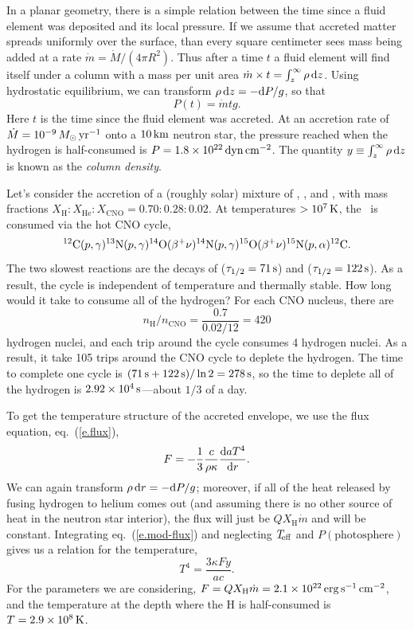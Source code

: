 In a planar geometry, there is a simple relation between the time since a fluid element was deposited and its local pressure. If we assume that accreted matter spreads uniformly over the surface, than every square centimeter sees mass being added at a rate $\dot{m} = \dot{M}/(4\pi R^{2})$.  Thus after a time $t$ a fluid element will find itself under a column with a mass per unit area $\dot{m}\times t = \int_{z}^{\infty}\rho\usp\dif z$. Using hydrostatic equilibrium, we can transform $\rho\usp\dif z = -\dif P/g$, so that
\[
P(t) = \dot{m}tg.
\]
Here $t$ is the time since the fluid element was accreted.  At an accretion rate of $\dot{M} = 10^{-9}\nsp\Msun\usp\yr^{-1}$ onto a $10\nsp\km$ neutron star, the pressure reached when the hydrogen is half-consumed is $P = 1.8\ee{22}\nsp\dyne\usp\cm^{-2}$.  The quantity $y\equiv \int_{z}^{\infty}\rho\usp\dif z$ is known as the \emph{column density}.

Let's consider the accretion of a (roughly solar) mixture of \hydrogen, \helium, and \carbon, with mass fractions $X_{\mathrm{H}}:X_{\mathrm{He}}:X_{\mathrm{CNO}} = 0.70:0.28:0.02$. At temperatures $> 10^{7}\nsp\K$, the \hydrogen\ is consumed via the hot CNO cycle,
\[
	\carbon(\pt,\gamma)\nitrogen[13](\pt,\gamma)\oxygen[14](\beta^{+}\nu)\nitrogen[14](\pt,\gamma) \oxygen[15](\beta^{+}\nu)\nitrogen[15](\pt,\alpha)\carbon.
\]
The two slowest  reactions are the decays of \oxygen[14] ($\tau_{1/2} = 71\nsp\second$) and \oxygen[15] ($\tau_{1/2} = 122\nsp\second$). As a result, the cycle is independent of temperature and thermally stable.
How long would it take to consume all of the hydrogen?  For each CNO nucleus, there are
\[ n_{\mathrm{H}}/n_{\mathrm{CNO}} = \frac{0.7}{0.02/12} = 420 \]
hydrogen nuclei, and each trip around the cycle consumes 4 hydrogen nuclei. As a result, it take 105 trips around the CNO cycle to deplete the hydrogen.  The time to complete one cycle is $(71\nsp\second + 122\nsp\second) /\ln 2 = 278\nsp\second$, so the time to deplete all of the hydrogen is $2.92\ee{4}\nsp\second$---about $1/3$ of a day.

To get the temperature structure of the accreted envelope, we use the flux equation, eq.~(\ref{e.flux}),
\begin{equation}\label{e.mod-flux}
F = -\frac{1}{3}\frac{c}{\rho\kappa}\frac{\dif aT^{4}}{\dif r}.
\end{equation}
We can again transform $\rho\usp\dif r = -\dif P/g$; moreover, if all of the heat released by fusing hydrogen to helium comes out (and assuming there is no other source of heat in the neutron star interior), the flux will just be $QX_{\mathrm{H}}\dot{m}$ and will be constant. Integrating eq.~(\ref{e.mod-flux}) and neglecting $\Teff$ and $P(\textrm{photosphere})$ gives us a relation for the temperature,
\[	T^{4} = \frac{3\kappa Fy}{ac}. \]
For the parameters we are considering, $F = QX_{\mathrm{H}}\dot{m} = 2.1\ee{22}\nsp\ergspersecond\usp\cm^{-2}$, and the temperature at the depth where the H is half-consumed is $T = 2.9\ee{8}\nsp\K$.

